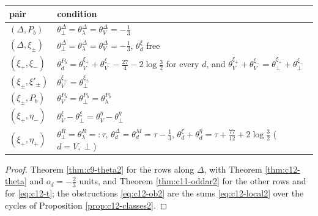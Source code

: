 \begin{tabular}{l|l}
pair & condition\\
\hline
$(\Delta,P_b)$ & $\theta^\Delta_\perp=\theta^\Delta_\lambda=\theta^\Delta_V=-\tfrac13$\\
$(\Delta,\xi_\pm)$ & $\theta^\Delta_\perp=\theta^\Delta_\lambda=\theta^\Delta_V=-\tfrac13$, $\theta^\xi_d$ free\\
$(\xi_+,\xi_-)$ & $\theta^{P_b}_d=\theta^{\xi_+}_V+\theta^{\xi_-}_V-\tfrac{27}4-2\log\tfrac32$ for every $d$, and $\theta^{\xi_+}_V+\theta^{\xi_-}_V=\theta^{\xi_+}_\perp+\theta^{\xi_-}_\perp$\\
$(\xi_\pm,\xi'_\pm)$ & $\theta^{\xi_\pm}_V=\theta^{\xi_\pm}_\perp$\\
$(\xi_\pm,P_b)$ & $\theta^{P_b}_V=\theta^{P_b}_\perp=\theta^{P_b}_\lambda$\\
$(\xi_+,\eta_-)$ & $\theta^\xi_V-\theta^\xi_\perp=\theta^\eta_V-\theta^\eta_\perp$\\
$(\xi_+,\eta_+)$ & $\theta^R_\perp=\theta^R_\lambda=:\tau$, $\theta^\Delta_d=\theta^M_d=\tau-\tfrac13$, $\theta^\xi_d+\theta^\eta_d=\tau+\tfrac{77}{12}+2\log\tfrac32$ ($d=V,\perp$)\\
\end{tabular}

\begin{proof}
Theorem \ref{thm:c9-theta2} for the rows along $\Delta$, with Theorem \ref{thm:c12-theta} and $o_d=-\tfrac23$ units, and Theorem \ref{thm:c11-oddar2} for the other rows and for \eqref{eq:c12-t}; the obstructions \eqref{eq:c12-ob2} are the sums \eqref{eq:c12-local2} over the cycles of Proposition \ref{prop:c12-classes2}.
\end{proof}

